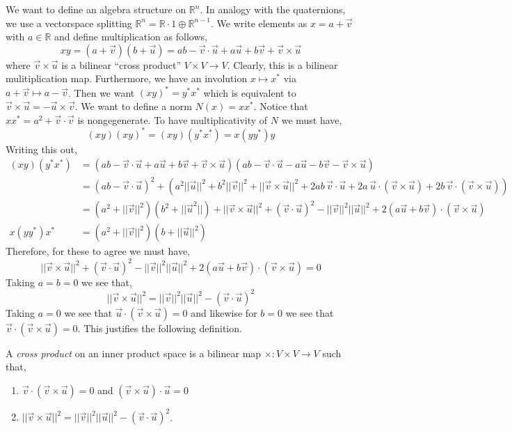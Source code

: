\documentclass[12pt]{extarticle}
\newcommand{\R}{\mathbb{R}}
\begin{document}
\begin{rmk}
We want to define an algebra structure on $\R^n$. In analogy with the quaternions, we use a vectorspace splitting $\R^n = \R \cdot 1 \oplus \R^{n-1}$. We write elements as $x = a + \vec{v}$ with $a \in \R$ and define multiplication as follows,
\[ x y = (a + \vec{v}) (b + \vec{u}) = ab - \vec{v} \cdot \vec{u} + a \vec{u} + b \vec{v} + \vec{v} \times \vec{u} \]
where $\vec{v} \times \vec{u}$ is a bilinear ``cross product'' $V \times V \to V$. Clearly, this is a bilinear mulitiplication map. Furthermore, we have an involution $x \mapsto x^*$ via $a + \vec{v} \mapsto a - \vec{v}$. Then we want $(xy)^* = y^* x^*$ which is equivalent to $\vec{v} \times \vec{u} = - \vec{u} \times \vec{v}$. We want to define a norm $N(x) = x x^*$. Notice that $x x^* = a^2 + \vec{v} \cdot \vec{v}$ is nongegenerate. To have multiplicativity of $N$ we must have,
\[ (xy) (xy)^* = (xy) (y^* x^*) = x (y y^*) y \]
Writing this out,
\begin{align*}
(xy) (y^* x^*) & = (ab - \vec{v} \cdot \vec{u} + a \vec{u} + b \vec{v} + \vec{v} \times \vec{u}) (ab - \vec{v} \cdot \vec{u} - a \vec{u} - b \vec{v} - \vec{v} \times \vec{u})
\\
& = (ab - \vec{v} \cdot \vec{u})^2 + (a^2 ||\vec{u}||^2 + b^2 ||\vec{v}||^2 + ||\vec{v} \times \vec{u}||^2 + 2 ab \, \vec{v} \cdot \vec{u} + 2 a \, \vec{u} \cdot (\vec{v} \times \vec{u}) + 2 b \, \vec{v} \cdot (\vec{v} \times \vec{u}))
\\
& = (a^2 + ||\vec{v}||^2)(b^2 + ||\vec{u}^2||) + ||\vec{v} \times \vec{u}||^2 + (\vec{v} \cdot \vec{u})^2 - ||\vec{v}||^2 ||\vec{u}||^2 + 2 (a \vec{u} + b \vec{v}) \cdot (\vec{v} \times \vec{u})
\\
x (y y^*) x^* & = (a^2 + ||\vec{v}||^2)(b + ||\vec{u}||^2)
\end{align*}
Therefore, for these to agree we must have,
\[ ||\vec{v} \times \vec{u}||^2 + (\vec{v} \cdot \vec{u})^2 - ||\vec{v}||^2 ||\vec{u}||^2 + 2 (a \vec{u} + b \vec{v}) \cdot (\vec{v} \times \vec{u}) = 0 \]
Taking $a = b = 0$ we see that,
\[ || \vec{v} \times \vec{u} ||^2 = ||\vec{v}||^2 ||\vec{u}||^2 - (\vec{v} \cdot \vec{u})^2 \]
Taking $a = 0$ we see that $\vec{u} \cdot (\vec{v} \times \vec{u}) = 0$ and likewise for $b = 0$ we see that $\vec{v} \cdot (\vec{v} \times \vec{u}) = 0$. This justifies the following definition.
\end{rmk}

\begin{defn}
A \textit{cross product} on an inner product space is a bilinear map $\times : V \times V \to V$ such that,
\begin{enumerate}
\item $\vec{v} \cdot (\vec{v} \times \vec{u}) = 0$ and $(\vec{v} \times \vec{u}) \cdot \vec{u} = 0$
\item $|| \vec{v} \times \vec{u} ||^2 = || \vec{v} ||^2 || \vec{u} ||^2 - (\vec{v} \cdot \vec{u})^2$.
\end{enumerate}
\end{defn}
\end{document}
